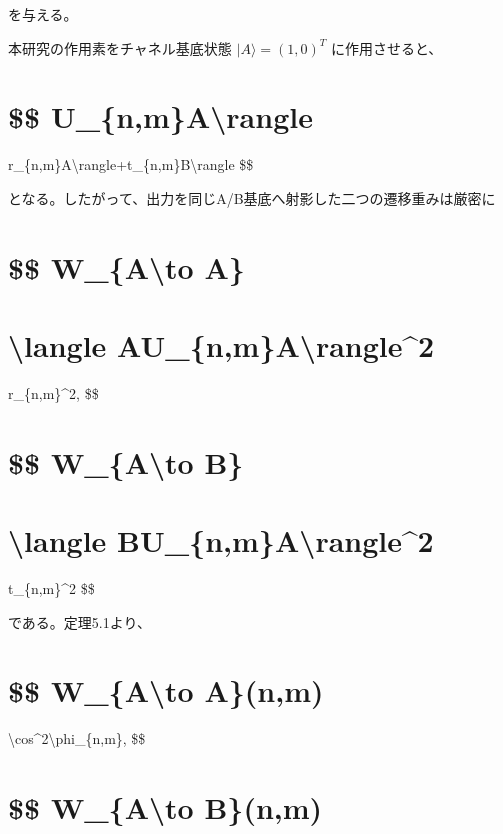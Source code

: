 \documentclass[
  a4paper,
  10pt]{article}
\begin{document}
を与える。

本研究の作用素をチャネル基底状態 \(|A\rangle=(1,0)^T\) に作用させると、

\section{\$\$
U\_\{n,m\}\textbar A\textbackslash rangle}\label{-u_nmarangle}

r\_\{n,m\}\textbar A\textbackslash rangle+t\_\{n,m\}\textbar B\textbackslash rangle
\$\$

となる。したがって、出力を同じA/B基底へ射影した二つの遷移重みは厳密に

\section{\$\$ W\_\{A\textbackslash to A\}}\label{-w_ato-a}

\section{\textbar\textbackslash langle
A\textbar U\_\{n,m\}\textbar A\textbackslash rangle\textbar\^{}2}\label{langle-au_nmarangle2}

\textbar r\_\{n,m\}\textbar\^{}2, \$\$

\section{\$\$ W\_\{A\textbackslash to B\}}\label{-w_ato-b}

\section{\textbar\textbackslash langle
B\textbar U\_\{n,m\}\textbar A\textbackslash rangle\textbar\^{}2}\label{langle-bu_nmarangle2}

\textbar t\_\{n,m\}\textbar\^{}2 \$\$

である。定理5.1より、

\section{\$\$ W\_\{A\textbackslash to A\}(n,m)}\label{-w_ato-anm}

\textbackslash cos\^{}2\textbackslash phi\_\{n,m\}, \$\$

\section{\$\$ W\_\{A\textbackslash to B\}(n,m)}\label{-w_ato-bnm}
\end{document}
